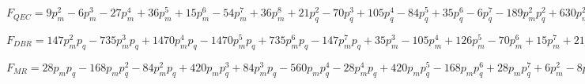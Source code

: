 $F_{QEC} = 9p_{m}^{2} - 6p_{m}^{3} - 27p_{m}^{4} + 36p_{m}^{5} + 15p_{m}^{6} - 54p_{m}^{7} + 36p_{m}^{8} + 21p_{q}^{2} - 70p_{q}^{3} + 105p_{q}^{4} - 84p_{q}^{5} + 35p_{q}^{6} - 6p_{q}^{7} - 189p_{m}^{2}p_{q}^{2} + 630p_{m}^{2}p_{q}^{3} + 126p_{m}^{3}p_{q}^{2} - 945p_{m}^{2}p_{q}^{4} - 420p_{m}^{3}p_{q}^{3} + 567p_{m}^{4}p_{q}^{2} + 756p_{m}^{2}p_{q}^{5} + 630p_{m}^{3}p_{q}^{4} - 1890p_{m}^{4}p_{q}^{3} - 756p_{m}^{5}p_{q}^{2} - 315p_{m}^{2}p_{q}^{6} - 504p_{m}^{3}p_{q}^{5} + 2835p_{m}^{4}p_{q}^{4} + 2520p_{m}^{5}p_{q}^{3} - 315p_{m}^{6}p_{q}^{2}$

$F_{DBR} = 147p_{m}^{2}p_{q} - 735p_{m}^{3}p_{q} + 1470p_{m}^{4}p_{q} - 1470p_{m}^{5}p_{q} + 735p_{m}^{6}p_{q} - 147p_{m}^{7}p_{q} + 35p_{m}^{3} - 105p_{m}^{4} + 126p_{m}^{5} - 70p_{m}^{6} + 15p_{m}^{7} + 21p_{q}^{2} - 70p_{q}^{3} + 105p_{q}^{4} - 84p_{q}^{5} + 35p_{q}^{6} - 6p_{q}^{7} - 882p_{m}^{2}p_{q}^{2} + 2205p_{m}^{2}p_{q}^{3} + 3675p_{m}^{3}p_{q}^{2} - 2940p_{m}^{2}p_{q}^{4} - 8575p_{m}^{3}p_{q}^{3} - 6615p_{m}^{4}p_{q}^{2} + 2205p_{m}^{2}p_{q}^{5} + 11025p_{m}^{3}p_{q}^{4} + 14700p_{m}^{4}p_{q}^{3} + 6174p_{m}^{5}p_{q}^{2} - 882p_{m}^{2}p_{q}^{6} - 8085p_{m}^{3}p_{q}^{5} - 18375p_{m}^{4}p_{q}^{4} - 13230p_{m}^{5}p_{q}^{3} - 2940p_{m}^{6}p_{q}^{2}$

$F_{MR} = 28p_{m}p_{q} - 168p_{m}p_{q}^{2} - 84p_{m}^{2}p_{q} + 420p_{m}p_{q}^{3} + 84p_{m}^{3}p_{q} - 560p_{m}p_{q}^{4} - 28p_{m}^{4}p_{q} + 420p_{m}p_{q}^{5} - 168p_{m}p_{q}^{6} + 28p_{m}p_{q}^{7} + 6p_{m}^{2} - 8p_{m}^{3} + 3p_{m}^{4} + 21p_{q}^{2} - 70p_{q}^{3} + 105p_{q}^{4} - 84p_{q}^{5} + 35p_{q}^{6} - 6p_{q}^{7} + 378p_{m}^{2}p_{q}^{2} - 840p_{m}^{2}p_{q}^{3} - 336p_{m}^{3}p_{q}^{2} + 1050p_{m}^{2}p_{q}^{4} + 700p_{m}^{3}p_{q}^{3} + 105p_{m}^{4}p_{q}^{2} - 756p_{m}^{2}p_{q}^{5} - 840p_{m}^{3}p_{q}^{4} - 210p_{m}^{4}p_{q}^{3} + 294p_{m}^{2}p_{q}^{6} + 588p_{m}^{3}p_{q}^{5} + 245p_{m}^{4}p_{q}^{4}$